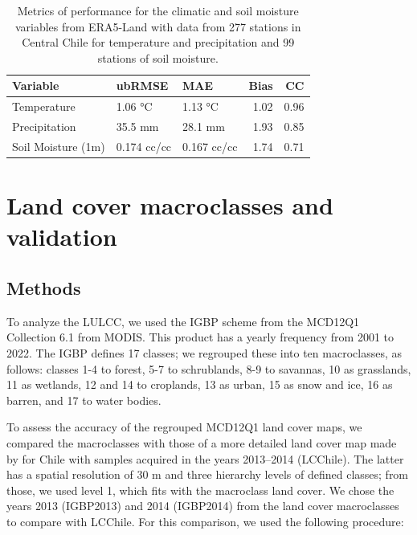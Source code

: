 \documentclass[
  authoryear,
  preprint,
  3p,
  onecolumn]{elsarticle}
\begin{document}
\begin{longtable}{lllrr}

\caption{\label{tbl-metricsera5}Metrics of performance for the climatic
and soil moisture variables from ERA5-Land with data from 277 stations
in Central Chile for temperature and precipitation and 99 stations of
soil moisture.}

\tabularnewline

\toprule
Variable & ubRMSE & MAE & Bias & CC \\ 
\midrule\addlinespace[2.5pt]
Temperature & 1.06 °C & 1.13 °C & 1.02 & 0.96 \\ 
Precipitation & 35.5 mm & 28.1 mm & 1.93 & 0.85 \\ 
Soil Moisture (1m) & 0.174 cc/cc & 0.167 cc/cc & 1.74 & 0.71 \\ 
\bottomrule

\end{longtable}

\section{Land cover macroclasses and
validation}\label{land-cover-macroclasses-and-validation}

\subsection{Methods}\label{methods-1}

To analyze the LULCC, we used the IGBP scheme from the MCD12Q1
Collection 6.1 from MODIS. This product has a yearly frequency from 2001
to 2022. The IGBP defines 17 classes; we regrouped these into ten
macroclasses, as follows: classes 1-4 to forest, 5-7 to schrublands, 8-9
to savannas, 10 as grasslands, 11 as wetlands, 12 and 14 to croplands,
13 as urban, 15 as snow and ice, 16 as barren, and 17 to water bodies.

To assess the accuracy of the regrouped MCD12Q1 land cover maps, we
compared the macroclasses with those of a more detailed land cover map
made by \citet{Zhao2016} for Chile with samples acquired in the years
2013--2014 (LCChile). The latter has a spatial resolution of 30 m and
three hierarchy levels of defined classes; from those, we used level 1,
which fits with the macroclass land cover. We chose the years 2013
(IGBP2013) and 2014 (IGBP2014) from the land cover macroclasses to
compare with LCChile. For this comparison, we used the following
procedure:
\end{document}
